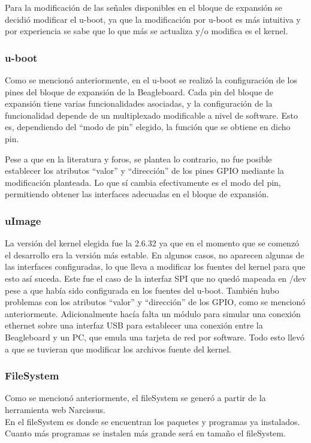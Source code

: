 \documentclass[%
        final,
        notitlepage,
        narroweqnarray,
        inline,
        ]{ieee}
\begin{document}
Para la modificación de las señales disponibles en el bloque de expansión se decidió modificar el u-boot, ya que la modificación por u-boot es más intuitiva y por experiencia se sabe que lo que más se actualiza y/o modifica es el kernel. 

\subsubsection{u-boot}
Como se mencionó anteriormente, en el u-boot se realizó la configuración de los pines del bloque de expansión de la Beagleboard. 
Cada pin del bloque de expansión tiene varias funcionalidades asociadas, y la configuración de la 
funcionalidad depende de un multiplexado modificable a nivel de software. Esto es, dependiendo del “modo de pin” elegido, la función que se obtiene en dicho pin.

Pese a que en la literatura y foros, se plantea lo contrario, no fue posible establecer los atributos “valor” y “dirección” de los pines GPIO mediante la modificación planteada. Lo que sí cambia efectivamente es el modo del pin, permitiendo obtener las interfaces adecuadas en el bloque de expansión.

\subsubsection{uImage}
La versión del kernel elegida fue la 2.6.32 ya que en el momento que se comenzó el desarrollo era la versión más estable.
En algunos casos, no aparecen algunas de las interfaces configuradas, lo que lleva a modificar los fuentes del kernel para que esto así suceda. Este fue el caso de la interfaz SPI que no quedó mapeada en /dev pese a que había sido configurada en los fuentes del u-boot. También hubo problemas con los atributos “valor” y “dirección” de los GPIO, como se mencionó anteriormente. Adicionalmente hacía falta un módulo para simular una conexión ethernet sobre una interfaz USB para establecer una conexión entre la Beagleboard y un PC, que emula una tarjeta de red por software.
Todo esto llevó a que se tuvieran que modificar los archivos fuente del kernel.

\subsubsection{FileSystem}

Como se mencionó anteriormente, el fileSystem se generó a partir de la herramienta web Narcissus.\\
En el fileSystem es donde se encuentran los paquetes y programas ya instalados. Cuanto más programas se instalen más grande será en tamaño el fileSystem.
\end{document}
